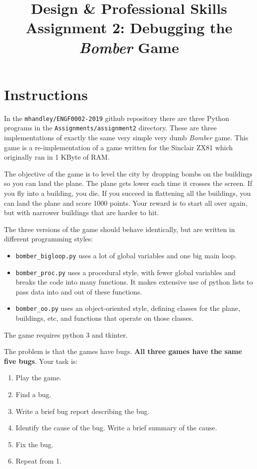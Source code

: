 \documentclass{article}
\title{Design \& Professional Skills\\
  Assignment 2: Debugging the {\em Bomber} Game}
\author{}
\date{}
\begin{document}
\maketitle

\section*{Instructions}

In the {\tt mhandley/ENGF0002-2019} github repository there are three
Python programs in the {\tt Assignments/assignment2} directory.  These
are three implementations of exactly the same very simple very dumb
{\em Bomber} game. This game is a re-implementation of a game written for
the Sinclair ZX81 which originally ran in 1 KByte of RAM.

The objective of the game is to level the city by dropping bombs on
the buildings so you can land the plane.  The plane gets lower each
time it crosses the screen.  If you fly into a building, you die.  If
you succeed in flattening all the buildings, you can land the plane
and score 1000 points.  Your reward is to start all over again, but
with narrower buildings that are harder to hit.  

The three versions of the game should behave identically, but are written in different programming styles:
\begin{itemize}
\item {\tt bomber\_bigloop.py} uses a lot of global variables and one big main loop.
\item{\tt bomber\_proc.py} uses a procedural style, with fewer global variables and breaks the code into many functions.  It makes extensive use of python lists to pass data into and out of these functions.
\item{\tt bomber\_oo.py} uses an object-oriented style, defining classes for the plane, buildings, etc, and functions that operate on those classes.
\end{itemize}
The game requires python 3 and tkinter.

The problem is that the games have bugs.  \textbf{All three games have the same five bugs}.  Your task is:
\begin{enumerate}
\item Play the game.
\item Find a bug.
\item Write a brief bug report describing the bug.
\item Identify the cause of the bug.  Write a brief summary of the cause.
\item Fix the bug.
\item Repeat from 1.
\end{enumerate}
\end{document}
